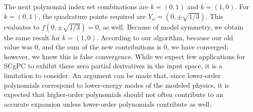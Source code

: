 The next polynomial
index set combinations are $k=(0,1)$ and $k=(1,0)$.  For $k=(0,1)$, the quadrature points required are
$Y_\omega=(0,\pm\sqrt{1/3})$.  This evaluates to $f(0,\pm\sqrt{1/3})=0$, as well.  Because of model symmetry, we obtain the
same result for $k=(1,0)$.  According to our algorithm, because our old value was 0, and the sum of the new
contributions is 0, we have converged; however, we know this is false convergence.  While we expect few
applications for SCgPC to exhibit these zero partial derivatives in the input space, it is a limitation to
consider.  An argument can be made that, since lower-order polynomials correspond to lower-energy modes of the
modeled physics, it is expected that higher-order polynomials should not often contribute to an accurate
expansion unless lower-order polynomials contribute as well.
